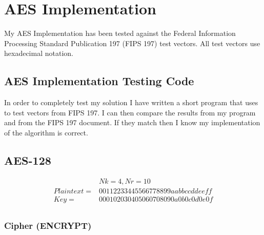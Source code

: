 \newpage
\section{AES Implementation}

My AES Implementation has been tested against the Federal Information Processing Standard Publication 197 (FIPS 197) test vectors. All test vectors use hexadecimal notation.

\subsection{AES Implementation Testing Code}

In order to completely test my solution I have written a short program that uses to test vectors from FIPS 197. I can then compare the results from my program and from the FIPS 197 document. If they match then I know my implementation of the algorithm is correct.



\subsection{AES-128}

\begin{align*}
&Nk=4, Nr=10 \\
Plaintext = &00112233445566778899aabbccddeeff \\
Key = &000102030405060708090a0b0c0d0e0f \\
\end{align*}

\subsubsection{Cipher (ENCRYPT)}

